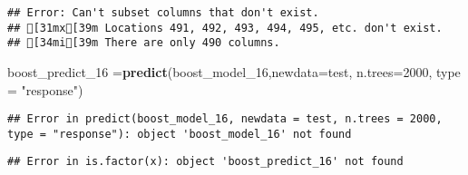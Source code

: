 \documentclass[
]{article}
\newenvironment{Shaded}{\begin{snugshade}}{\end{snugshade}}
\newcommand{\DataTypeTok}[1]{\textcolor[rgb]{0.13,0.29,0.53}{#1}}
\newcommand{\DecValTok}[1]{\textcolor[rgb]{0.00,0.00,0.81}{#1}}
\newcommand{\KeywordTok}[1]{\textcolor[rgb]{0.13,0.29,0.53}{\textbf{#1}}}
\newcommand{\NormalTok}[1]{#1}
\newcommand{\OperatorTok}[1]{\textcolor[rgb]{0.81,0.36,0.00}{\textbf{#1}}}
\newcommand{\StringTok}[1]{\textcolor[rgb]{0.31,0.60,0.02}{#1}}
\begin{document}
\begin{Shaded}
\end{Shaded}

\begin{verbatim}
## Error: Can't subset columns that don't exist.
## [31mx[39m Locations 491, 492, 493, 494, 495, etc. don't exist.
## [34mi[39m There are only 490 columns.
\end{verbatim}

\begin{Shaded}
\begin{Highlighting}[]
\NormalTok{boost_predict_}\DecValTok{16}\NormalTok{ =}\KeywordTok{predict}\NormalTok{(boost_model_}\DecValTok{16}\NormalTok{,}\DataTypeTok{newdata=}\NormalTok{test,}
                         \DataTypeTok{n.trees=}\DecValTok{2000}\NormalTok{, }\DataTypeTok{type =} \StringTok{"response"}\NormalTok{)}
\end{Highlighting}
\end{Shaded}

\begin{verbatim}
## Error in predict(boost_model_16, newdata = test, n.trees = 2000, type = "response"): object 'boost_model_16' not found
\end{verbatim}

\begin{Shaded}
\end{Shaded}

\begin{verbatim}
## Error in is.factor(x): object 'boost_predict_16' not found
\end{verbatim}
\end{document}
